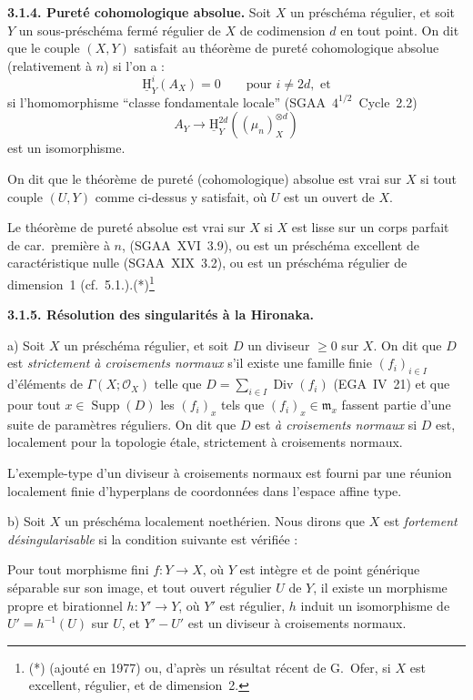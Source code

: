 \documentclass[11pt]{article}
\DeclareMathOperator{\Supp}{Supp}
\DeclareMathOperator{\Div}{Div}
\providecommand{\cO}{\mathcal{O}}
\providecommand{\fm}{\mathfrak{m}}
\renewcommand{\H}{\mathrm{H}}
\providecommand{\Supp}{\operatorname{Supp}}
\providecommand{\fm}{\mathfrak m}
\begin{document}
\textbf{3.1.4. Pureté cohomologique absolue.} Soit $X$ un préschéma régulier, et soit $Y$ un sous-préschéma fermé régulier de $X$ de codimension $d$ en tout point. On dit que le couple $(X,Y)$ satisfait au théorème de pureté cohomologique absolue (relativement à $n$) si l'on a :
\[
\underline{\H}^i_Y(A_X) = 0 \qquad \text{pour } i \neq 2d, \text{ et}
\]
si l'homomorphisme ``classe fondamentale locale'' (SGAA~$4^{1/2}$~Cycle~2.2)
\[
A_Y \longrightarrow \underline{\H}^{2d}_Y((\mu_n)^{\otimes d}_X)
\]
est un isomorphisme.

On dit que le théorème de pureté (cohomologique) absolue est vrai sur $X$ si tout couple $(U,Y)$ comme ci-dessus y satisfait, où $U$ est un ouvert de $X$.

Le théorème de pureté absolue est vrai sur $X$ si $X$ est lisse sur un corps parfait de car.~première à $n$, (SGAA~XVI~3.9), ou est un préschéma excellent de caractéristique nulle (SGAA~XIX~3.2), ou est un préschéma régulier de dimension~1 (cf.~5.1.).(*)\footnote{(*) (ajouté en 1977) ou, d'après un résultat récent de G.~Ofer, si $X$ est excellent, régulier, et de dimension~2.}

\textbf{3.1.5. Résolution des singularités à la Hironaka.}

a) Soit $X$ un préschéma régulier, et soit $D$ un diviseur $\geqslant 0$ sur $X$. On dit que $D$ est \emph{strictement à croisements normaux} s'il existe une famille finie $(f_i)_{i \in I}$ d'éléments de $\Gamma(X; \cO_X)$ telle que $D = \sum_{i \in I} \Div(f_i)$ (EGA~IV~21) et que pour tout $x \in \Supp(D)$ les $(f_i)_x$ tels que $(f_i)_x \in \fm_x$ fassent partie d'une suite de paramètres réguliers. On dit que $D$ est \emph{à croisements normaux} si $D$ est, localement pour la topologie étale, strictement à croisements normaux.

L'exemple-type d'un diviseur à croisements normaux est fourni par une réunion localement finie d'hyperplans de coordonnées dans l'espace affine type.

b) Soit $X$ un préschéma localement noethérien. Nous dirons que $X$ est \emph{fortement désingularisable} si la condition suivante est vérifiée :

Pour tout morphisme fini $f : Y \to X$, où $Y$ est intègre et de point générique séparable sur son image, et tout ouvert régulier $U$ de $Y$, il existe un morphisme propre et birationnel $h : Y' \to Y$, où $Y'$ est régulier, $h$ induit un isomorphisme de $U' = h^{-1}(U)$ sur $U$, et $Y' - U'$ est un diviseur à croisements normaux.
\end{document}
